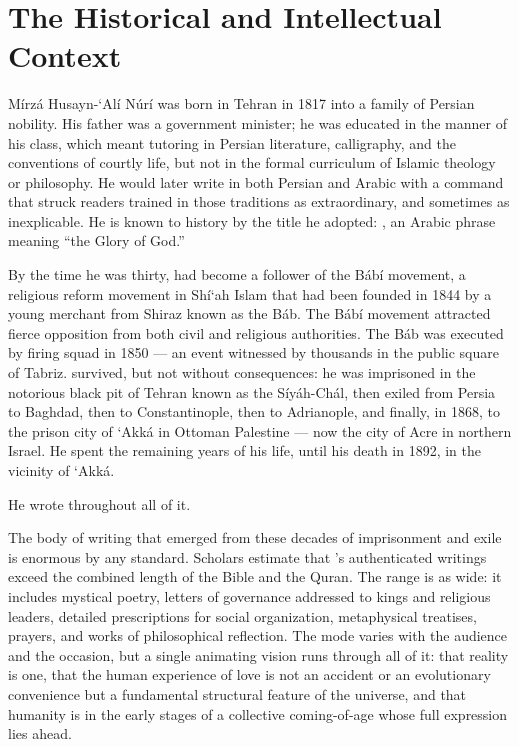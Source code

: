 \section{The Historical and Intellectual Context}
\label{sec:ch3-context}

Mírzá Husayn-`Alí Núrí was born in Tehran in 1817 into a family of
Persian nobility.
His father was a government minister; he was educated in the manner of his
class, which meant tutoring in Persian literature, calligraphy, and the
conventions of courtly life, but not in the formal curriculum of
Islamic theology or philosophy.
He would later write in both Persian and Arabic with a command that struck
readers trained in those traditions as extraordinary, and sometimes as
inexplicable.
He is known to history by the title he adopted: \Bahaullah, an Arabic phrase
meaning ``the Glory of God.''

By the time he was thirty, \Bahaullah had become a follower of the Bábí
movement, a religious reform movement in Shí`ah Islam that had been founded
in 1844 by a young merchant from Shiraz known as the Báb.
The Bábí movement attracted fierce opposition from both civil and religious
authorities.
The Báb was executed by firing squad in 1850 --- an event witnessed by
thousands in the public square of Tabriz.
\Bahaullah survived, but not without consequences: he was imprisoned in the
notorious black pit of Tehran known as the Síyáh-Chál, then exiled from Persia
to Baghdad, then to Constantinople, then to Adrianople, and finally, in 1868,
to the prison city of `Akká in Ottoman Palestine --- now the city of Acre in
northern Israel.
He spent the remaining years of his life, until his death in 1892, in the
vicinity of `Akká.

He wrote throughout all of it.

The body of writing that emerged from these decades of imprisonment and exile
is enormous by any standard.
Scholars estimate that \Bahaullah's authenticated writings exceed the combined
length of the Bible and the Quran.
The range is as wide: it includes mystical poetry, letters of
governance addressed to kings and religious leaders, detailed prescriptions
for social organization, metaphysical treatises, prayers, and works of
philosophical reflection.
The mode varies with the audience and the occasion, but a single animating
vision runs through all of it: that reality is one, that the human experience
of love is not an accident or an evolutionary convenience but a fundamental
structural feature of the universe, and that humanity is in the early stages
of a collective coming-of-age whose full expression lies ahead.

